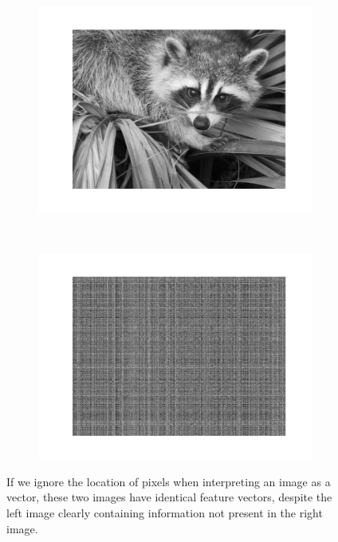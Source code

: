         \begin{figure}
            \centering
            \begin{subfigure}[t]{0.5\textwidth}
                \centering
                \includegraphics[width=\textwidth]{images/face.png}
            \end{subfigure}%
            ~
            \begin{subfigure}[t]{0.5\textwidth}
                \centering
                \includegraphics[width=\textwidth]{images/face_shuffled.png}
            \end{subfigure}
            \caption{If we ignore the location of pixels when interpreting an
                image as a vector, these two images have identical feature
                vectors, despite the left image clearly containing information
                not present in the right image.}
            \label{fig:shuffled-face}
        \end{figure}

